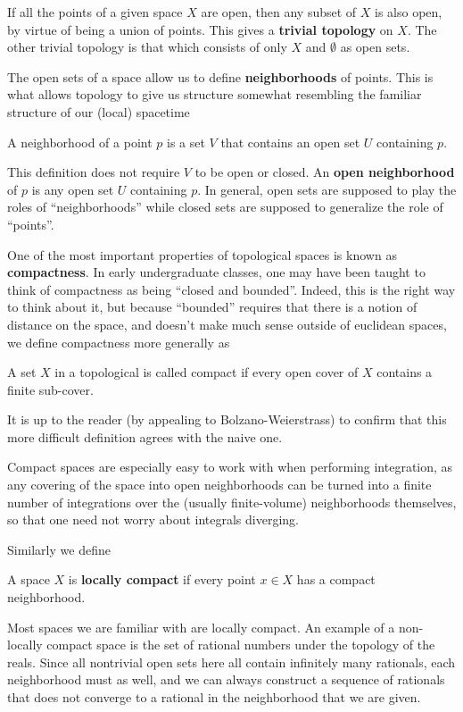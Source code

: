 	\begin{eg}
		If all the points of a given space $X$ are open, then any subset of $X$ is also open, by virtue of being a union of points. This gives a \textbf{trivial topology} on $X$. The other trivial topology is that which consists of only $X$ and $\emptyset$ as open sets.
	\end{eg}
	
	The open sets of a space allow us to define \textbf{neighborhoods} of points. This is what allows topology to give us structure somewhat resembling the familiar structure of our (local) spacetime
	\begin{defn}[Neighborhood]
		A neighborhood of a point $p$ is a set $V$ that contains an open set $U$ containing $p$.
	\end{defn}
	This definition does not require $V$ to be open or closed. An \textbf{open neighborhood} of $p$ is any open set $U$ containing $p$. In general, open sets are supposed to play the roles of ``neighborhoods'' while closed sets are supposed to generalize the role of ``points''.
	
	One of the most important properties of topological spaces is known as \textbf{compactness}. In early undergraduate classes, one may have been taught to think of compactness as being ``closed and bounded''. Indeed, this is the right way to think about it, but because ``bounded'' requires that there is a notion of distance on the space, and doesn't make much sense outside of euclidean spaces, we define compactness more generally as 
	\begin{defn}[Compact]
		A set $X$ in a topological is called compact if every open cover of $X$ contains a finite sub-cover.
	\end{defn}
	It is up to the reader (by appealing to Bolzano-Weierstrass) to confirm that this more difficult definition agrees with the naive one. 
	
	Compact spaces are especially easy to work with when performing integration, as any covering of the space into open neighborhoods can be turned into a finite number of integrations over the (usually finite-volume) neighborhoods themselves, so that one need not worry about integrals diverging. 
	
	Similarly we define
	\begin{defn}
		A space $X$ is \textbf{locally compact} if every point $x \in X$ has a compact neighborhood.
	\end{defn}
	
	Most spaces we are familiar with are locally compact. An example of a non-locally compact space is the set of rational numbers under the topology of the reals. Since all nontrivial open sets here all contain infinitely many rationals, each neighborhood must as well, and we can always construct a sequence of rationals that does not converge to a rational in the neighborhood that we are given. 
	
